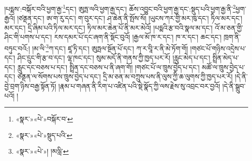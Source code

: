 །པདྨས་:བསྐོར་བའི་ཕྱག་རྒྱ་\footnote{«སྣར་»«པེ་»བསྐོར་བ་}དང་། ཨུཏྤ་ལའི་ཕྱག་རྒྱ་དང་། ཆོས་འབྱུང་བའི་ཕྱག་རྒྱ་དང་:སྡུད་པའི་ཕྱག་རྒྱ་ནི་\footnote{«སྣར་»«པེ་»སྡུད་པའི་}ཕྱག་རྒྱའོ། །ཙནྡན་དང་། ཨ་ག་རུ་དང་། ག་བུར་དང་། ཤ་ཆེན་ནི་སྤོས་སོ། །ཡུངས་ཀར་གྱི་མར་ཁུ་དང་། ཏིལ་མར་དང་། མར་དང་། དྲི་ཞིམ་པའི་ཏིལ་མར་དང་། ཏིལ་མར་ཆེན་པོ་ནི་མར་མེའོ། །པདྨའི་རྩ་བའི་སྣལ་མ་དང་། འོ་མ་ཅན་གྱི་ཤིང་གི་པགས་པ་དང་། རས་དམར་པོ་དང་ཞག་ནི་སྡོང་བུའོ། །རྒྱལ་མོ་ཁ་ར་དང་། ཁ་ར་དང་། ཆང་དང་། ཁྲག་ནི་བཏུང་བའོ:། །མ་ལི་\footnote{«སྣར་»«པེ་»། །མལླི་}ཀ་དང་། ཛཱ་ཏི་དང་། ཨུཏྤལ་སྔོན་པོ་དང་། ཀ་ར་བཱི་ར་ནི་མེ་ཏོག་གོ། །གཙང་པོ་གཉིས་འདྲེས་པ་དང་། ཤིང་དྲུང་གི་རྩ་བ་དང་། ལྷ་ཁང་དང་། སུམ་མདོ་ནི་གནས་ཀྱི་ཁྱད་པར་རོ། །རླུང་མེད་པ་དང་། སྤྲིན་མེད་པ་དང་། རླུང་དང་བཅས་པ་དང་། སྤྲིན་དང་བཅས་པ་ནི་ཞག་གོ། །གཙང་པོ་ལ་ཁྲུས་བྱེད་པ་དང་། མཚོ་ལ་ཁྲུས་བྱེད་པ་དང་། ཙནྡན་ལ་སོགས་པས་ཁྲུས་བྱེད་པ་དང་། དྲི་མ་ཅན་མ་བཀྲུས་པས་ནི་ལུས་ཀྱི་ཆ་ལུགས་ཀྱི་ཁྱད་པར་རོ། །དེ་ནི་བྱེ་བྲག་ཉིས་བརྒྱ་སྟོན་ཏོ། །རྣམ་པ་གཞན་ནི་རིག་པ་འཛིན་པའི་སྡེ་སྣོད་ཀྱི་ལས་རྗེས་སུ་འབྲང་བར་བྱའོ། །དེ་ནི་སྒྲུབ་པའོ། །
